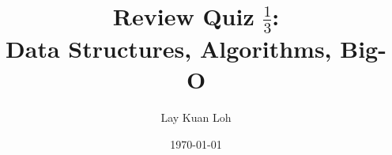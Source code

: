 \documentclass[12pt]{article}
\begin{document}

\title{Review Quiz $\frac{1}{3}$: \\
       Data Structures, Algorithms, Big-O}
\author{Lay Kuan Loh}
\date{\today}
\maketitle






\end{document}
